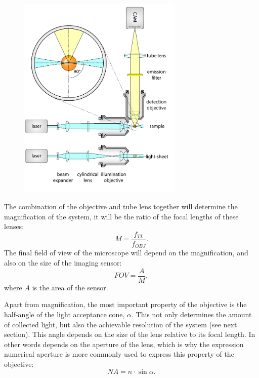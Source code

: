     \begin{figure}[tb]
      \centering
      \includegraphics[page=4,width=0.7\textwidth]{spim_cyl}
      \label{fig:wide-field}
    \end{figure}


    The combination of the objective and tube lens together will determine the magnification of the system, it will be the ratio of the focal lengths of these lenses:
    \begin{equation}
      M = \frac{f_{TL}}{f_{OBJ}}.
      \label{eq:magnification}
    \end{equation}
    The final field of view of the microscope will depend on the magnification, and also on the size of the imaging sensor:
    \begin{equation}
      FOV = \frac{A}{M},
      \label{eq:FOV}
    \end{equation}
    where $A$ is the area of the sensor. 

    Apart from magnification, the most important property of the objective is the half-angle of the light acceptance cone, $\alpha$. This not only determines the amount of collected light, but also the achievable resolution of the system (see next section). This angle depends on the size of the lens relative to its focal length. In other words depends on the aperture of the lens, which is why the expression numerical aperture is more commonly used to express this property of the objective:
    \begin{equation}
      NA = n\cdot \sin \alpha.
      \label{eq:NA}
    \end{equation}

